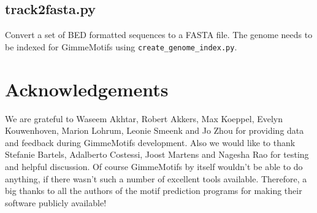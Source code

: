 \documentclass[11pt]{article}
\begin{document}
\subsection*{track2fasta.py }
Convert a set of BED formatted sequences to a FASTA file. The genome needs to be indexed for GimmeMotifs using \texttt{create\_genome\_index.py}.


\section{Acknowledgements}
We are grateful to Waseem Akhtar, Robert Akkers, Max Koeppel, Evelyn Kouwenhoven, Marion Lohrum, Leonie Smeenk and Jo Zhou for providing data and feedback during GimmeMotifs development. Also we would like to thank Stefanie Bartels, Adalberto Costessi, Joost Martens and Nagesha Rao for testing and helpful discussion.
Of course GimmeMotifs by itself wouldn't be able to do anything, if there wasn't such a number of excellent tools available. Therefore, a big thanks to all the authors of the motif prediction programs for making their software publicly available!


\end{document}
